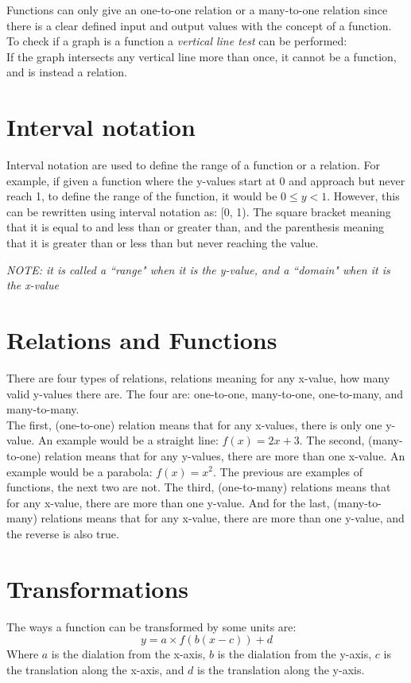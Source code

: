 \documentclass[a4paper,10pt]{report}
\begin{document}
Functions can only give an one-to-one relation or a many-to-one relation since there is a clear defined input and output values with the concept of a function.  To check if a graph is a function a \emph{vertical line test} can be performed:\\

If the graph intersects any vertical line more than once, it cannot be a function, and is instead a relation.

\section{Interval notation}
Interval notation are used to define the range of a function or a relation.  For example, if given a function where the y-values start at 0 and approach but never reach 1, to define the range of the function, it would be $0 \leq y < 1$.  However, this can be rewritten using interval notation as: [0, 1).  The square bracket meaning that it is equal to and less than or greater than, and the parenthesis meaning that it is greater than or less than but never reaching the value.\\

\begin{center}
	\emph{NOTE:  it is called a ``range" when it is the y-value, and a ``domain" when it is the x-value}
\end{center}

\section{Relations and Functions}
There are four types of relations, relations meaning for any x-value, how many valid y-values there are.  The four are: one-to-one, many-to-one, one-to-many, and many-to-many.\\

The first, (one-to-one) relation means that for any x-values, there is only one y-value.  An example would be a straight line: $f(x) = 2x + 3$.  The second, (many-to-one) relation means that for any y-values, there are more than one x-value.  An example would be a parabola: $f(x) = x^2$.  The previous are examples of functions, the next two are not.  The third, (one-to-many) relations means that for any x-value, there are more than one y-value.  And for the last, (many-to-many) relations means that for any x-value, there are more than one y-value, and the reverse is also true.

\section{Transformations}
The ways a function can be transformed by some units are:
$$
	y = a \times f(b(x - c)) + d
$$
Where $a$ is the dialation from the x-axis, $b$ is the dialation from the y-axis, $c$ is the translation along the x-axis, and $d$ is the translation along the y-axis.
\end{document}
